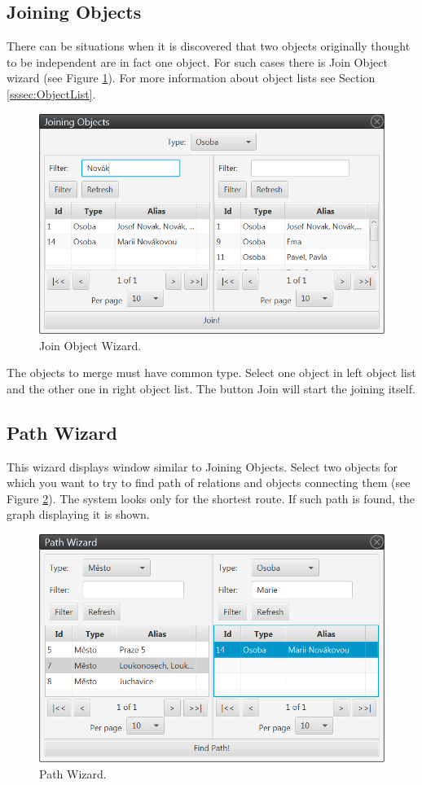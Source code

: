 \subsection{Joining Objects}
\label{ssec:JoinObjects}

There can be situations when it is discovered that two objects originally
thought to be independent are in fact one object. For such cases there is Join
Object wizard (see Figure \ref{fig:Join}). For more information about object
lists see Section \ref{sssec:ObjectList}.

\begin{figure}[!htb]
        \centering
        \includegraphics[width=\textwidth]{Images/join}
        \caption{Join Object Wizard.}
        \label{fig:Join}
\end{figure}

The objects to merge must have common type. Select one object in left object
list and the other one in right object list. The button Join will start the
joining itself.

\subsection{Path Wizard}
This wizard displays window similar to Joining Objects. Select two objects
for which you want to try to find path of relations and objects connecting them
(see Figure \ref{fig:Path}). The system looks only for the shortest route.
If such path is found, the graph displaying it is shown.

\begin{figure}[!htb]
        \centering
        \includegraphics[width=\textwidth]{Images/path}
        \caption{Path Wizard.}
        \label{fig:Path}
\end{figure}

